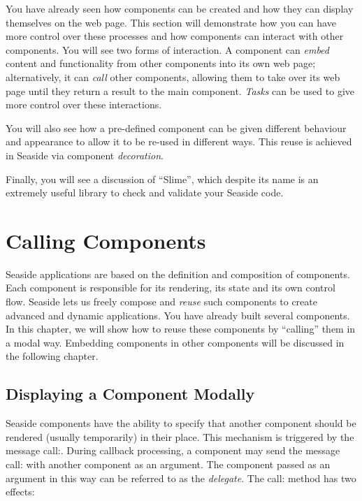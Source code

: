 \documentclass[a4paper,10pt,twoside]{book}
\newcommand{\ct}[1]{{\small\ttfamily\textup{#1}}}
\begin{document}
You have already seen how components can be created and how they can display themselves on the web page. This section will demonstrate how you can have more control over these processes and how components can interact with other components. You will see two forms of interaction. A component can \textit{embed} content and functionality from other components into its own web page; alternatively, it can \textit{call} other components, allowing them to take over its web page until they return a result to the main component. \textit{Tasks} can be used to give more control over these interactions. 

You will also see how a pre-defined component can be given different behaviour and appearance to allow it to be re-used in different ways. This reuse is achieved in Seaside via component \textit{decoration}. 

Finally, you will see a discussion of ``Slime'', which despite its name is an extremely useful library to check and validate your Seaside code.

\chapter{Calling Components}
\label{book:components:calling}

Seaside applications are based on the definition and composition of components. Each component is responsible for its rendering, its state and its own control flow. Seaside lets us freely compose and \textit{reuse} such components to create advanced and dynamic applications. You have already built several components. In this chapter, we will show how to reuse these components by ``calling'' them in a modal way. Embedding components in other components will be discussed in the following chapter.

\section{Displaying a Component Modally}
\label{book:components:calling:modaldisplay}

Seaside components have the ability to specify that another component should be rendered (usually temporarily) in their place. This mechanism is triggered by the message \ct{call:}. During callback processing, a component may send the message \ct{call:} with another component as an argument. The component passed as an argument in this way can be referred to as the \textit{delegate}. The \ct{call:} method has two effects:
\end{document}
